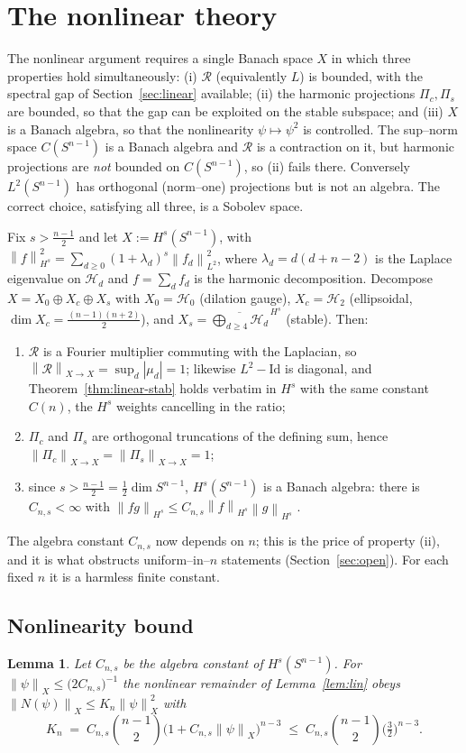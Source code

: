 \documentclass[10pt,a4paper]{amsart}
\newtheorem{lemma}[theorem]{Lemma}
\newcommand{\Sph}{S^{n-1}}
\newcommand{\Rad}{\mathcal{R}}
\newcommand{\Hd}[1]{\mathcal{H}_{#1}}
\newcommand{\norm}[1]{\left\lVert #1 \right\rVert}
\newcommand{\abs}[1]{\left\lvert #1 \right\rvert}
\begin{document}
\section{The nonlinear theory}\label{sec:nonlinear}

The nonlinear argument requires a single Banach space $X$ in which three
properties hold simultaneously: (i) $\Rad$ (equivalently $L$) is bounded, with
the spectral gap of Section~\ref{sec:linear} available; (ii) the harmonic
projections $\Pi_c,\Pi_s$ are bounded, so that the gap can be exploited on the
stable subspace; and (iii) $X$ is a Banach algebra, so that the nonlinearity
$\psi\mapsto\psi^2$ is controlled. The sup--norm space $C(\Sph)$ is a Banach
algebra and $\Rad$ is a contraction on it, but harmonic projections are
\emph{not} bounded on $C(\Sph)$, so (ii) fails there. Conversely $L^2(\Sph)$
has orthogonal (norm--one) projections but is not an algebra. The correct
choice, satisfying all three, is a Sobolev space.

Fix $s>\tfrac{n-1}{2}$ and let $X:=H^s(\Sph)$, with
$\norm f_{H^s}^2=\sum_{d\ge0}(1+\lambda_d)^s\norm{f_d}_{L^2}^2$, where
$\lambda_d=d(d+n-2)$ is the Laplace eigenvalue on $\Hd d$ and $f=\sum_d f_d$
is the harmonic decomposition. Decompose $X=X_0\oplus X_c\oplus X_s$ with
$X_0=\Hd 0$ (dilation gauge), $X_c=\Hd 2$ (ellipsoidal,
$\dim X_c=\tfrac{(n-1)(n+2)}{2}$), and
$X_s=\overline{\bigoplus_{d\ge4}\Hd d}^{\,H^s}$ (stable). Then:
\begin{enumerate}[label=(\roman*)]
\item $\Rad$ is a Fourier multiplier commuting with the Laplacian, so
$\norm{\Rad}_{X\to X}=\sup_d\abs{\mu_d}=1$; likewise $L^2-\mathrm{Id}$ is
diagonal, and Theorem~\ref{thm:linear-stab} holds verbatim in $H^s$ with the
same constant $C(n)$, the $H^s$ weights cancelling in the ratio;
\item $\Pi_c$ and $\Pi_s$ are orthogonal truncations of the defining sum, hence
$\norm{\Pi_c}_{X\to X}=\norm{\Pi_s}_{X\to X}=1$;
\item since $s>\tfrac{n-1}{2}=\tfrac12\dim\Sph$, $H^s(\Sph)$ is a Banach
algebra: there is $C_{n,s}<\infty$ with $\norm{fg}_{H^s}\le C_{n,s}\norm
f_{H^s}\norm g_{H^s}$ \cite[Ch.~4]{Taylor2011}.
\end{enumerate}
The algebra constant $C_{n,s}$ now depends on $n$; this is the price of
property (ii), and it is what obstructs uniform--in--$n$ statements
(Section~\ref{sec:open}). For each fixed $n$ it is a harmless finite constant.

\subsection{Nonlinearity bound}
\begin{lemma}\label{lem:nl-bound}
Let $C_{n,s}$ be the algebra constant of $H^s(\Sph)$. For
$\norm\psi_X\le \big(2C_{n,s}\big)^{-1}$ the nonlinear remainder of
Lemma~\ref{lem:lin} obeys $\norm{N(\psi)}_X\le K_n\norm\psi_X^2$ with
\[
   K_n\;=\;C_{n,s}\binom{n-1}{2}\big(1+C_{n,s}\norm\psi_X\big)^{n-3}
   \;\le\;C_{n,s}\binom{n-1}{2}\Big(\tfrac32\Big)^{n-3}.
\]
\end{lemma}
\end{document}
